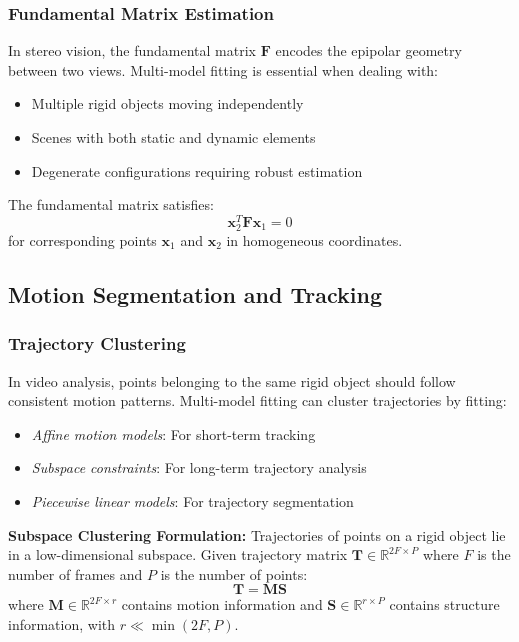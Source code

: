 \documentclass[12pt]{article}
\renewcommand{\vec}[1]{\mathbf{#1}}
\begin{document}
\subsubsection{Fundamental Matrix Estimation}
\label{subsubsec:fundamental_matrix}

In stereo vision, the fundamental matrix $\mathbf{F}$ encodes the epipolar geometry between two views. Multi-model fitting is essential when dealing with:
\begin{itemize}
    \item Multiple rigid objects moving independently
    \item Scenes with both static and dynamic elements
    \item Degenerate configurations requiring robust estimation
\end{itemize}

The fundamental matrix satisfies:
\begin{equation}
    \vec{x}_2^T \mathbf{F} \vec{x}_1 = 0
    \label{eq:fundamental_matrix}
\end{equation}
for corresponding points $\vec{x}_1$ and $\vec{x}_2$ in homogeneous coordinates.

\subsection{Motion Segmentation and Tracking}
\label{subsec:motion_applications}

\subsubsection{Trajectory Clustering}
\label{subsubsec:trajectory_clustering}

In video analysis, points belonging to the same rigid object should follow consistent motion patterns. Multi-model fitting can cluster trajectories by fitting:
\begin{itemize}
    \item \textit{Affine motion models}: For short-term tracking
    \item \textit{Subspace constraints}: For long-term trajectory analysis
    \item \textit{Piecewise linear models}: For trajectory segmentation
\end{itemize}

\textbf{Subspace Clustering Formulation:} Trajectories of points on a rigid object lie in a low-dimensional subspace. Given trajectory matrix $\mathbf{T} \in \mathbb{R}^{2F \times P}$ where $F$ is the number of frames and $P$ is the number of points:
\begin{equation}
    \mathbf{T} = \mathbf{M} \mathbf{S}
    \label{eq:trajectory_factorization}
\end{equation}
where $\mathbf{M} \in \mathbb{R}^{2F \times r}$ contains motion information and $\mathbf{S} \in \mathbb{R}^{r \times P}$ contains structure information, with $r \ll \min(2F, P)$.
\end{document}
